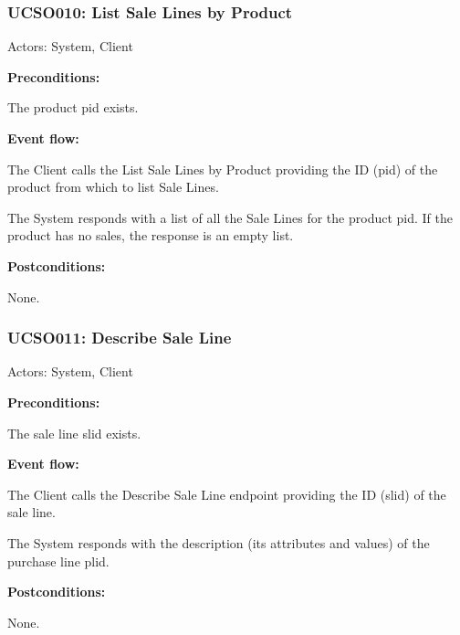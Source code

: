 \begin{ucbox}{\subsubsection{UCSO010: List Sale Lines by Product}}
\label{UCSO010}

Actors: System, Client

\textbf{Preconditions:}

\ucitem The product pid exists.

\textbf{Event flow:}

\ucitem The Client calls the List Sale Lines by Product providing the ID (pid) of the product from which to list Sale Lines.

\ucitem The System responds with a list of all the Sale Lines for the product pid. If the product has no sales, the response is an empty list.

\textbf{Postconditions:}

\ucitem None.

\end{ucbox}

\begin{ucbox}{\subsubsection{UCSO011: Describe Sale Line}}
\label{UCSO011}

Actors: System, Client

\textbf{Preconditions:}

\ucitem The sale line slid exists.

\textbf{Event flow:}

\ucitem The Client calls the Describe Sale Line endpoint providing the ID (slid) of the sale line.

\ucitem The System responds with the description (its attributes and values) of the purchase line plid.

\textbf{Postconditions:}

\ucitem None.

\end{ucbox}

